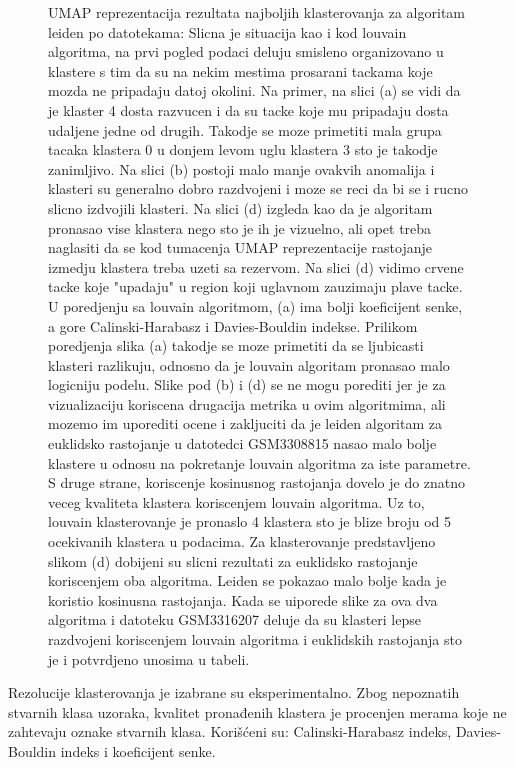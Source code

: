 \documentclass{article}
\begin{document}
\begin{figure}[H]
    \caption{ UMAP reprezentacija rezultata najboljih klasterovanja za algoritam leiden po datotekama: Slicna je situacija kao i kod louvain algoritma, na prvi pogled podaci deluju smisleno organizovano u klastere s tim da su na nekim mestima prosarani tackama koje mozda ne pripadaju datoj okolini. Na primer, na slici (a) se vidi da je klaster 4 dosta razvucen i da su tacke koje mu pripadaju dosta udaljene jedne od drugih. Takodje se moze primetiti mala grupa tacaka klastera 0 u donjem levom uglu klastera 3 sto je takodje zanimljivo. Na slici (b) postoji malo manje ovakvih anomalija i klasteri su generalno dobro razdvojeni i moze se reci da bi se i rucno slicno izdvojili klasteri. Na slici (d) izgleda kao da je algoritam pronasao vise klastera nego sto je ih je vizuelno, ali opet treba naglasiti da se kod tumacenja UMAP reprezentacije rastojanje izmedju klastera treba uzeti sa rezervom. Na slici (d) vidimo crvene tacke koje "upadaju" u region koji uglavnom zauzimaju plave tacke. U poredjenju sa louvain algoritmom, (a) ima bolji koeficijent senke, a gore Calinski-Harabasz i Davies-Bouldin indekse. Prilikom poredjenja slika (a) takodje se moze primetiti da se ljubicasti klasteri razlikuju, odnosno da je louvain algoritam pronasao malo logicniju podelu. Slike pod (b) i (d) se ne mogu porediti jer je za vizualizaciju koriscena drugacija metrika u ovim algoritmima, ali mozemo im uporediti ocene i zakljuciti da je leiden algoritam za euklidsko rastojanje u datotedci GSM3308815 nasao malo bolje klastere u odnosu na pokretanje louvain algoritma za iste parametre. S druge strane, koriscenje kosinusnog rastojanja dovelo je do znatno veceg kvaliteta klastera koriscenjem louvain algoritma. Uz to, louvain klasterovanje je pronaslo 4 klastera sto je blize broju od 5 ocekivanih klastera u podacima\cite{PBMC_ANN_classification}. Za klasterovanje predstavljeno slikom (d) dobijeni su slicni rezultati za euklidsko rastojanje koriscenjem oba algoritma. Leiden se pokazao malo bolje kada je koristio kosinusna rastojanja. Kada se uiporede slike za ova dva algoritma i datoteku GSM3316207 deluje da su klasteri lepse razdvojeni koriscenjem louvain algoritma i euklidskih rastojanja sto je i potvrdjeno unosima u tabeli. }
    \label{fig:best_leiden}
\end{figure}

Rezolucije klasterovanja je izabrane su eksperimentalno. Zbog nepoznatih stvarnih klasa uzoraka, kvalitet pronađenih klastera je procenjen merama koje ne zahtevaju oznake stvarnih klasa. Korišćeni su: Calinski-Harabasz\cite{calinskiharabasz} indeks, Davies-Bouldin\cite{davies1979cluster} indeks i koeficijent senke.
\end{document}
